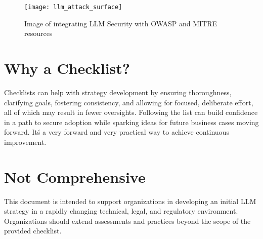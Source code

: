 \clearpage

\begin{figure}[h]
  \centering
  \texttt{[image: llm\_attack\_surface]}
  \caption{Image of integrating LLM Security with OWASP and MITRE resources}
  \label{fig:llm-attack-surface}
\end{figure}

\section{Why a Checklist?}

Checklists can help with strategy development by ensuring thoroughness,
clarifying goals, fostering consistency, and allowing for focused, deliberate
effort, all of which may result in fewer oversights. Following the list can
build confidence in a path to secure adoption while sparking ideas for future
business cases moving forward. It\'s a very forward and very practical way to
achieve continuous improvement.

\section{Not Comprehensive}

This document is intended to support organizations in developing an initial LLM
strategy in a rapidly changing technical, legal, and regulatory environment.
Organizations should extend assessments and practices beyond the scope of the
provided checklist.
